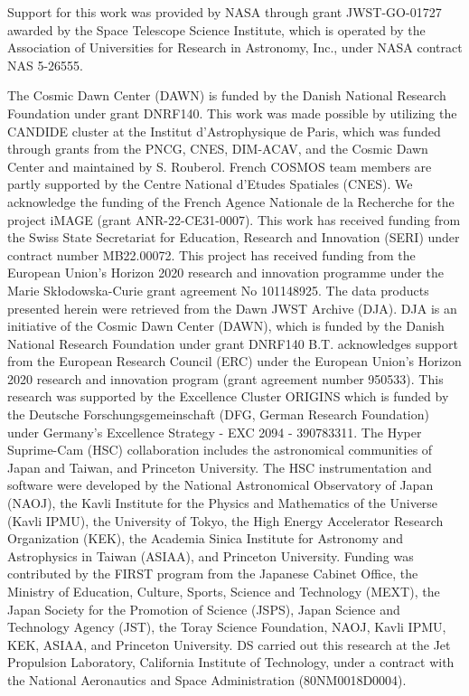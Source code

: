 \documentclass[longauth]{aa}
\begin{document}
\begin{acknowledgements}

Support for this work was provided by NASA through grant JWST-GO-01727 awarded by the Space Telescope Science Institute, which is operated by the Association of Universities for Research in Astronomy, Inc., under NASA contract NAS 5-26555.

The Cosmic Dawn Center (DAWN) is funded by the Danish National Research Foundation under grant DNRF140. 
This work was made possible by utilizing the CANDIDE cluster at the Institut d’Astrophysique de Paris, which was funded through grants from the PNCG, CNES, DIM-ACAV, and the Cosmic Dawn Center and maintained by S. Rouberol. French COSMOS team members are partly supported by the Centre National d’Etudes Spatiales (CNES). We acknowledge the funding of the French Agence Nationale de la Recherche for the project iMAGE (grant ANR-22-CE31-0007). 
This work has received funding from the Swiss State Secretariat for Education, Research and Innovation (SERI) under contract number MB22.00072.
This project has received funding from the European Union’s Horizon 2020 research and innovation programme under the Marie Skłodowska-Curie grant agreement No 101148925.
The data products presented herein were retrieved from the Dawn JWST Archive (DJA). DJA is an initiative of the Cosmic Dawn Center (DAWN), which is funded by the Danish National Research Foundation under grant DNRF140
B.T. acknowledges support from the European Research Council (ERC) under the European Union's Horizon 2020 research and innovation program (grant agreement number 950533). 
This research was supported by the Excellence Cluster ORIGINS which is funded by the Deutsche Forschungsgemeinschaft (DFG, German Research Foundation) under Germany's Excellence Strategy - EXC 2094 - 390783311.
The Hyper Suprime-Cam (HSC) collaboration includes the astronomical communities of Japan and Taiwan, and Princeton University. The HSC instrumentation and software were developed by the National Astronomical Observatory of Japan (NAOJ), the Kavli Institute for the Physics and Mathematics of the Universe (Kavli IPMU), the University of Tokyo, the High Energy Accelerator Research Organization (KEK), the Academia Sinica Institute for Astronomy and Astrophysics in Taiwan (ASIAA), and Princeton University. Funding was contributed by the FIRST program from the Japanese Cabinet Office, the Ministry of Education, Culture, Sports, Science and Technology (MEXT), the Japan Society for the Promotion of Science (JSPS), Japan Science and Technology Agency (JST), the Toray Science Foundation, NAOJ, Kavli IPMU, KEK, ASIAA, and Princeton University. 
DS carried out this research at the Jet Propulsion Laboratory, California Institute of Technology, under a contract with the National Aeronautics and Space Administration (80NM0018D0004).


\end{acknowledgements}
\end{document}
